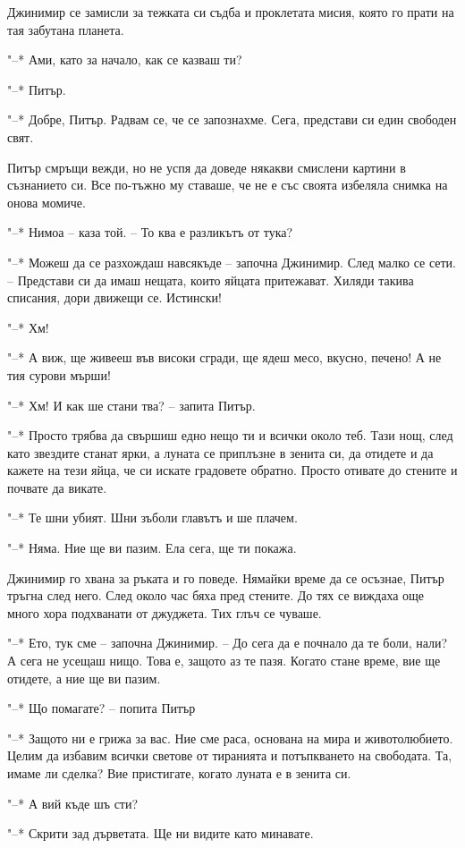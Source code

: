 \documentclass[ebook,openany,12pt]{memoir}
\begin{document}
Джинимир се замисли за тежката си съдба и проклетата мисия, която го прати на тая забутана планета.

"--* Ами, като за начало, как се казваш ти?

"--* Питър.

"--* Добре, Питър. Радвам се, че се запознахме. Сега, представи си един свободен свят.

Питър смръщи вежди, но не успя да доведе някакви смислени картини в съзнанието си. Все по-тъжно му ставаше, че не е със своята избеляла снимка на онова момиче.

"--* Нимоа – каза той. – То ква е разликътъ от тука?

"--* Можеш да се разхождаш навсякъде – започна Дж\-инимир. След малко се сети. – Представи си да имаш нещата, които яйцата притежават. Хиляди такива списания, дори движещи се. Истински!

"--* Хм!

"--* А виж, ще живееш във високи сгради, ще ядеш месо, вкусно, печено! А не тия сурови мърши!

"--* Хм! И как ше стани тва? – запита Питър.

"--* Просто трябва да свършиш едно нещо ти и всички около теб. Тази нощ, след като звездите станат ярки, а луната се приплъзне в зенита си, да отидете и да кажете на тези яйца, че си искате градовете обратно. Просто отивате до стените и почвате да викате.

"--* Те шни убият. Шни зъболи главътъ и ше плачем.

"--* Няма. Ние ще ви пазим. Ела сега, ще ти покажа.

Джинимир го хвана за ръката и го поведе. Нямайки време да се осъзнае, Питър тръгна след него. След около час бяха пред стените. До тях се виждаха още много хора подхванати от джуджета. Тих глъч се чуваше.

"--* Ето, тук сме – започна Джинимир. -- До сега да е почнало да те боли, нали? А сега не усещаш нищо. Това е, защото аз те пазя. Когато стане време, вие ще отидете, а ние ще ви пазим.

"--* Що помагате? – попита Питър

"--* Защото ни е грижа за вас. Ние сме раса, основана на мира и животолюбието. Целим да избавим всички светове от тиранията и потъпкването на свободата. Та, имаме ли сделка? Вие пристигате, когато луната е в зенита си.

"--* А вий къде шъ сти?

"--* Скрити зад дърветата. Ще ни видите като минавате.
\end{document}

